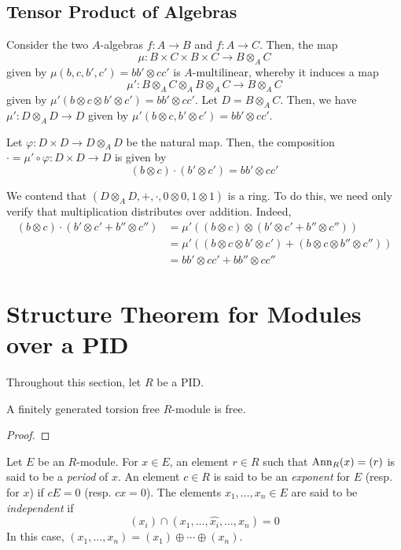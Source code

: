 \subsection{Tensor Product of Algebras}

Consider the two $A$-algebras $f: A\to B$ and $f: A\to C$. Then, the map 
\begin{equation*}
    \mu: B\times C\times B\times C\to B\otimes_A C
\end{equation*}
given by $\mu(b,c,b',c') = bb'\otimes cc'$ is $A$-multilinear, whereby it induces a map 
\begin{equation*}
    \mu': B\otimes_A C\otimes_A B\otimes_A C\to B\otimes_A C 
\end{equation*}
given by $\mu'(b\otimes c\otimes b'\otimes c') = bb'\otimes cc'$. Let $D = B\otimes_A C$. Then, we have $\mu': D\otimes_A D\to D$ given by $\mu'(b\otimes c,b'\otimes c') = bb'\otimes cc'$.

Let $\varphi: D\times D\to D\otimes_A D$ be the natural map. Then, the composition $\cdot = \mu'\circ\varphi: D\times D\to D$ is given by 
\begin{equation*}
    (b\otimes c)\cdot(b'\otimes c') = bb'\otimes cc'
\end{equation*}

We contend that $(D\otimes_A D,+,\cdot,0\otimes 0, 1\otimes 1)$ is a ring. To do this, we need only verify that multiplication distributes over addition. Indeed, 
\begin{align*}
    (b\otimes c)\cdot(b'\otimes c' + b''\otimes c'') &= \mu'\left((b\otimes c)\otimes (b'\otimes c' + b''\otimes c'')\right)\\
    &= \mu'((b\otimes c\otimes b'\otimes c') + (b\otimes c\otimes b''\otimes c''))\\
    &= bb'\otimes cc' + bb''\otimes cc''
\end{align*}

\section{Structure Theorem for Modules over a PID}
Throughout this section, let $R$ be a PID.

\begin{lemma}
    A finitely generated torsion free $R$-module is free.
\end{lemma}
\begin{proof}
\end{proof}

\begin{definition}
    Let $E$ be an $R$-module. For $x\in E$, an element $r\in R$ such that $\operatorname{Ann}_R(x) = (r)$ is said to be a \textit{period} of $x$. An element $c\in R$ is said to be an \textit{exponent} for $E$ (resp. for $x$) if $cE = 0$ (resp. $cx = 0$). The elements $x_1,\ldots,x_n\in E$ are said to be \textit{independent} if 
    \begin{equation*}
        (x_i)\cap(x_1,\ldots,\widehat{x_i},\ldots,x_n) = 0
    \end{equation*}
    In this case, $(x_1,\ldots,x_n) = (x_1)\oplus\cdots\oplus(x_n)$.
\end{definition}

